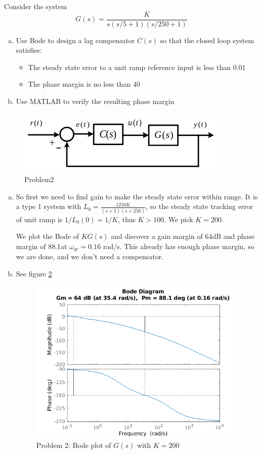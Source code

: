 \documentclass[11pt]{article}
\begin{document}
Consider the system
$$
G(s) = \frac{K}{s(s/5 + 1)(s/250 + 1)}
$$
\begin{enumerate}[a)]
    \item Use Bode to design a lag compensator $C(s)$ so that the closed loop system satisfies:
    \begin{itemize}
        \item The steady state error to a unit ramp reference input is less than 0.01
        \item The phase margin is no less than 40\degree
    \end{itemize}
    \item Use MATLAB to verify the resulting phase margin
\end{enumerate}
\begin{figure}[h] 
    \centering
    \includegraphics[width=0.55 \linewidth]{12-04-p1.png}
    \caption{Problem2}
    \label{fig:p2}
\end{figure}

\soln

\begin{enumerate}[a)]
    \item So first we need to find gain to make the steady state error within range.
    It is a type 1 system with $L_0 = \frac{1250 K}{(s + 5)(s + 250)}$, so the steady state
    tracking error of unit ramp is $1/L_0(0) = 1/K$, thus $K > 100$.
    We pick $K = 200$.
    
    We plot the Bode of $KG(s)$ and discover a gain margin of 64dB and phase margin of 88.1\degree at $\omega_{gc} = 0.16$ rad/s.
    This already has enough phase margin, so we are done, and we don't need a compensator.

    \item See figure \ref{fig:p2_bode_1} 
    \begin{figure}[h]
        \centering
        \includegraphics[width=0.55 \linewidth]{p2_bode_1.png}
        \caption{Problem 2: Bode plot of $G(s)$ with $K=200$}
        \label{fig:p2_bode_1}
    \end{figure}
\end{enumerate}
\end{document}
